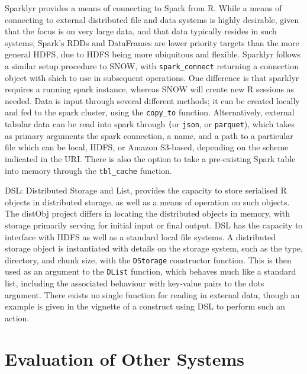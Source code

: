 \documentclass[a4paper,10pt]{article}
\begin{document}
Sparklyr provides a means of connecting to Spark from R\cite{luraschi20}.
While a means of connecting to external distributed file and data systems is
highly desirable, given that the focus is on very large data, and that data
typically resides in such systems, Spark's RDDs and DataFrames are lower
priority targets than the more general HDFS, due to HDFS being more ubiquitous
and flexible.
Sparklyr follows a similar setup procedure to SNOW, with
\texttt{spark\_connect} returning a connection object with shich to use
in subsequent operations.
One difference is that sparklyr requires a running spark instance, whereas SNOW
will create new R sessions as needed.
Data is input through several different methods; it can be created locally and fed to the spark cluster, using the \texttt{copy\_to} function.
Alternatively, external tabular data can be read into spark through
\texttt (or \texttt{json}, or
\texttt{parquet}), which takes as primary arguments the spark
connection, a name, and a path to a particular file which can be local, HDFS,
or Amazon S3-based, depending on the scheme indicated in the URI.
There is also the option to take a pre-existing Spark table into memory through
the \texttt{tbl\_cache} function.

DSL: Distributed Storage and List, provides the capacity to store serialised R
objects in distributed storage, as well as a means of operation on such
objects\cite{theussl2020dsl}.
The distObj project differs in locating the distributed objects in memory, with
storage primarily serving for initial input or final output.
DSL has the capacity to interface with HDFS as well as a standard local file systems.
A distributed storage object is instantiated with details on the storage
system, such as the type, directory, and chunk size, with the
\texttt{DStorage} constructor function.
This is then used as an argument to the \texttt{DList} function, which
behaves much like a standard list, including the associated behaviour with
key-value pairs to the dots argument.
There exists no single function for reading in external data, though an example
is given in the vignette of a construct using DSL to perform such an action.

\section{Evaluation of Other Systems}

\end{document}
